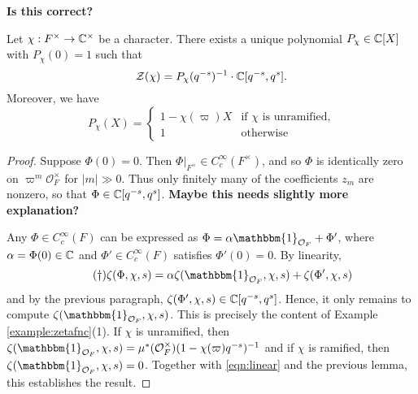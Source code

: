 \textbf{Is this correct?}
\fi

\begin{prop}\label{prop:gl1factor}
    Let $\chi:F^\times \to \mathbb{C}^\times$ be a character. There exists a unique polynomial $P_\chi \in \mathbb{C}[X]$ with $P_\chi(0)=1$ such that
    $$\mathcal Z(\chi) = P_\chi(q^{-s})^{-1}\cdot \mathbb{C}[q^{-s},q^s].$$
    Moreover, we have
    $$
    P_\chi(X) =
    \begin{cases}
        1-\chi(\varpi)X & \text{if $\chi$ is unramified,} \\
        1 & \text{otherwise}
    \end{cases}
    $$
\end{prop}
\begin{proof}
    Suppose $\Phi(0)=0$. Then $\Phi|_{F^\times} \in C_c^\infty(F^\times)$, and so $\Phi$ is identically zero on $\varpi^m\mathcal O_F^\times$ for $|m| \gg0$. Thus only finitely many of the coefficients $z_m$ are nonzero, so that $\Phi \in \mathbb{C}[q^{-s},q^s]$. \textbf{Maybe this needs slightly more explanation?}

    Any $\Phi\in C_c^\infty(F)$ can be expressed as $\Phi=\alpha\mathbbm{1}_{\mathcal{O}_F}+\Phi'$, where $\alpha=\Phi(0)\in\mathbb{C}$ and $\Phi'\in C_c^\infty(F)$ satisfies $\Phi'(0)=0$. By linearity,
    \begin{equation}\tag{\dag}\label{eqn:linear}
        \zeta(\Phi,\chi,s)=\alpha\zeta(\mathbbm{1}_{\mathcal{O}_F},\chi,s)+\zeta(\Phi',\chi,s)
    \end{equation}
    and by the previous paragraph, $\zeta(\Phi',\chi,s)\in\mathbb{C}[q^{-s},q^{s}]$. Hence, it only remains to compute $\zeta(\mathbbm{1}_{\mathcal O_F},\chi,s)$. This is precisely the content of Example \ref{example:zetafnc}(1). If $\chi$ is unramified, then $\zeta(\mathbbm{1}_{\mathcal O_F},\chi,s)=\mu^*(\mathcal{O}_F^\times)(1-\chi(\varpi)q^{-s})^{-1}$ and if $\chi$ is ramified, then $\zeta(\mathbbm{1}_{\mathcal O_F},\chi,s)=0$. Together with \eqref{eqn:linear} and the previous lemma, this establishes the result. 
\end{proof}

\iffalse
\begin{rem}
    The computation in the proof above shows, in the case $\chi = 1$, that $\zeta(\mathbbm{1}_{\cO_F},1,s) = (1-q^{-s})^{-1}$, provided that $\mu^*(\mathcal{O}_F^\times)=1$. If $F=K_v$ is the completion of a number field $K$ at a non-Archimedean place $v$, we recover the Euler factor of the Dedekind zeta function $\zeta_K(s)$ at the place $v$. This explains the naming of our zeta functions. 
\end{rem}
\fi

